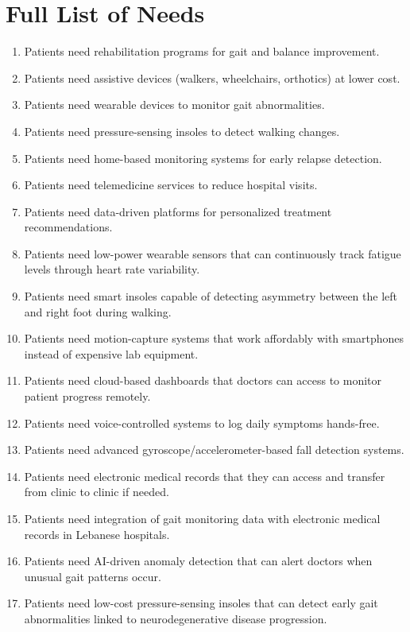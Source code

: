 \chapter{Full List of Needs}

\begin{enumerate}
    \item Patients need rehabilitation programs for gait and balance improvement.
    \item Patients need assistive devices (walkers, wheelchairs, orthotics) at lower cost.
    \item Patients need wearable devices to monitor gait abnormalities.
    \item Patients need pressure-sensing insoles to detect walking changes.
    \item Patients need home-based monitoring systems for early relapse detection.
    \item Patients need telemedicine services to reduce hospital visits.
    \item Patients need data-driven platforms for personalized treatment recommendations.
    \item Patients need low-power wearable sensors that can continuously track fatigue levels through heart rate variability.
    \item Patients need smart insoles capable of detecting asymmetry between the left and right foot during walking.
    \item Patients need motion-capture systems that work affordably with smartphones instead of expensive lab equipment.
    \item Patients need cloud-based dashboards that doctors can access to monitor patient progress remotely.
    \item Patients need voice-controlled systems to log daily symptoms hands-free.
    \item Patients need advanced gyroscope/accelerometer-based fall detection systems.
    \item Patients need electronic medical records that they can access and transfer from clinic to clinic if needed.
    \item Patients need integration of gait monitoring data with electronic medical records in Lebanese hospitals.
    \item Patients need AI-driven anomaly detection that can alert doctors when unusual gait patterns occur.
    \item Patients need low-cost pressure-sensing insoles that can detect early gait abnormalities linked to neurodegenerative disease progression.

\end{enumerate}
